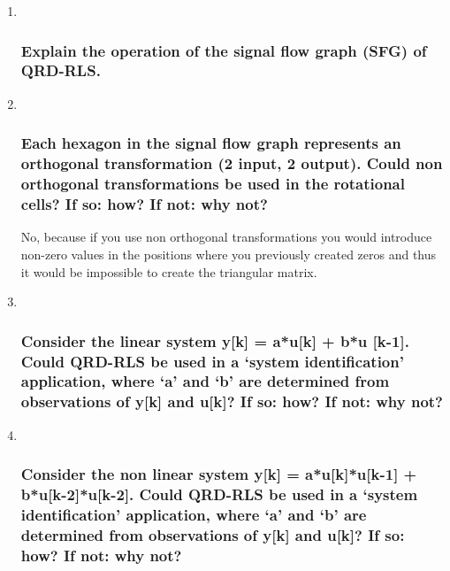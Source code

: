 \documentclass[
  a4paper,
  ,captions=tableheading
]{scrartcl}
\begin{document}
\begin{enumerate}
\def\labelenumi{\arabic{enumi}.}
\item ~
  \subsubsection{Explain the operation of the signal flow graph (SFG) of
  QRD-RLS.}\label{explain-the-operation-of-the-signal-flow-graph-sfg-of-qrd-rls.}
\item ~
  \subsubsection{Each hexagon in the signal flow graph represents an
  orthogonal transformation (2 input, 2 output). Could non orthogonal
  transformations be used in the rotational cells? If so: how? If not:
  why
  not?}\label{each-hexagon-in-the-signal-flow-graph-represents-an-orthogonal-transformation-2-input-2-output.-could-non-orthogonal-transformations-be-used-in-the-rotational-cells-if-so-how-if-not-why-not}

  No, because if you use non orthogonal transformations you would
  introduce non-zero values in the positions where you previously
  created zeros and thus it would be impossible to create the triangular
  matrix.
\item ~
  \subsubsection{Consider the linear system y{[}k{]} = a*u{[}k{]} + b*u
  {[}k-1{]}. Could QRD-RLS be used in a `system identification'
  application, where `a' and `b' are determined from observations of
  y{[}k{]} and u{[}k{]}? If so: how? If not: why
  not?}\label{consider-the-linear-system-yk-auk-bu-k-1.-could-qrd-rls-be-used-in-a-system-identification-application-where-a-and-b-are-determined-from-observations-of-yk-and-uk-if-so-how-if-not-why-not}
\item ~
  \subsubsection{Consider the non linear system y{[}k{]} =
  a*u{[}k{]}*u{[}k-1{]} + b*u{[}k-2{]}*u{[}k-2{]}. Could QRD-RLS be used
  in a `system identification' application, where `a' and `b' are
  determined from observations of y{[}k{]} and u{[}k{]}? If so: how? If
  not: why
  not?}\label{consider-the-non-linear-system-yk-aukuk-1-buk-2uk-2.-could-qrd-rls-be-used-in-a-system-identification-application-where-a-and-b-are-determined-from-observations-of-yk-and-uk-if-so-how-if-not-why-not}
\end{enumerate}
\end{document}
